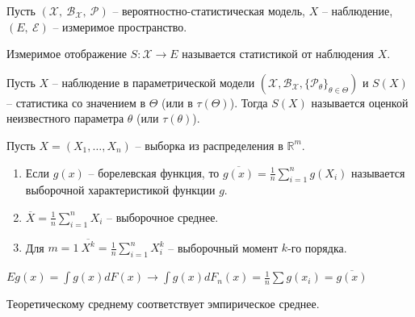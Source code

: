 Пусть $\displaystyle (\mathcal{X},\ \mathcal{B}_{\mathcal{X}},\ \mathcal{P})$ -- вероятностно-статистическая модель, $\displaystyle X$ -- наблюдение, $\displaystyle ( E,\ \mathcal{E})$ -- измеримое пространство.
\begin{definition}
Измеримое отображение $\displaystyle S:\mathcal{X}\rightarrow E$ называется статистикой от наблюдения $\displaystyle X$.
\end{definition}
\begin{definition}
Пусть $\displaystyle X$ --  наблюдение в параметрической модели $(\mathcal{X}, \mathcal{B}_{\mathcal{X}}, \{\mathcal{P}_{\theta}\}_{\theta \in \Theta})$ и $S(\displaystyle X)$ -- статистика со значением в $\Theta$ (или в $\tau (\Theta)$). Тогда $S(\displaystyle X)$ называется оценкой неизвестного параметра $\theta$ (или $\tau(\theta)$).
\end{definition}
\begin{example}
Пусть $\displaystyle X=( X_{1} ,\dotsc ,X_{n})$ -- выборка из распределения в $\displaystyle \mathbb{R}^{m}$.
\begin{enumerate}
    \item Если $\displaystyle g( x)$ -- борелевская функция, то $\displaystyle \overline{g( x)} =\frac{1}{n}\sum _{i=1}^{n} g( X_{i})$ называется выборочной характеристикой функции $\displaystyle g$.
    
    \item $\displaystyle \overline{X} =\frac{1}{n}\sum _{i=1}^{n} X_{i}$ -- выборочное среднее.
    
    \item Для $\displaystyle m=1\ \overline{X^{k}} =\frac{1}{n}\sum _{i=1}^{n} X_{i}^{k}$ -- выборочный момент $\displaystyle k$-го порядка.
\end{enumerate}
\end{example}

\begin{note}
$Eg(x) = \int g(x)dF(x) \longrightarrow
\int g(x)dF_n(x) = \frac{1}{n} \sum g(x_i) = \overline{g(x)}$

Теоретическому среднему соответствует эмпирическое среднее.
\end{note}\

